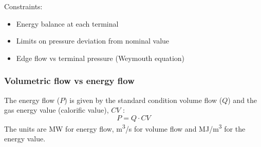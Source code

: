 \documentclass[12pt]{article}
\begin{document}
\medskip\noindent
Constraints:
\begin{itemize}
	\item Energy balance at each terminal 
	\item Limits on pressure deviation from nominal value
	\item Edge flow vs terminal pressure (Weymouth equation)
\end{itemize}

\subsubsection{Volumetric flow vs energy flow}
The energy flow ($P$) is given by the standard condition volume flow ($Q$) and the gas energy value (calorific value),  $CV$ : 
 \begin{equation}
 	 P=Q \cdot CV 
\end{equation}
The units are MW for energy flow, m\textsuperscript{3}/s for volume flow and MJ/m\textsuperscript{3} for the energy value.
\end{document}
